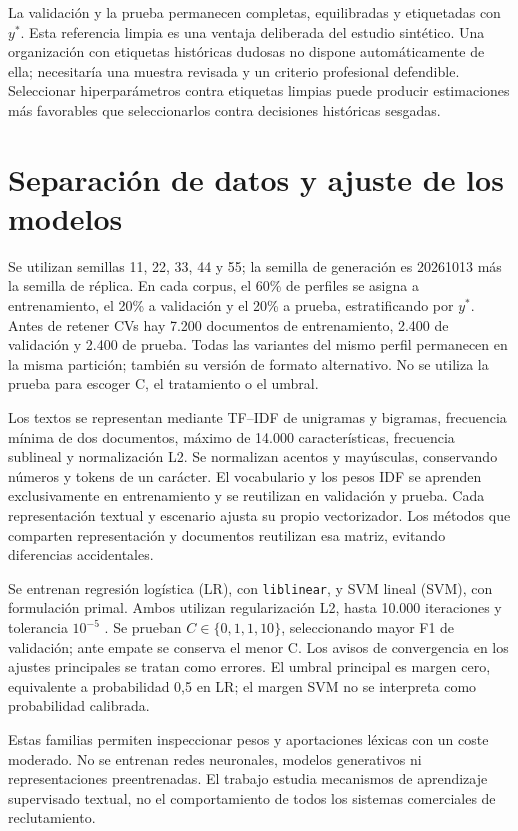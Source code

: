 \documentclass[11pt,a4paper,oneside]{report}
\begin{document}
La validación y la prueba permanecen completas, equilibradas y etiquetadas con $y^*$. Esta referencia limpia es una ventaja deliberada del estudio sintético. Una organización con etiquetas históricas dudosas no dispone automáticamente de ella; necesitaría una muestra revisada y un criterio profesional defendible. Seleccionar hiperparámetros contra etiquetas limpias puede producir estimaciones más favorables que seleccionarlos contra decisiones históricas sesgadas.

\section{Separación de datos y ajuste de los modelos}
Se utilizan semillas 11, 22, 33, 44 y 55; la semilla de generación es 20261013 más la semilla de réplica. En cada corpus, el 60\% de perfiles se asigna a entrenamiento, el 20\% a validación y el 20\% a prueba, estratificando por $y^*$. Antes de retener CVs hay 7.200 documentos de entrenamiento, 2.400 de validación y 2.400 de prueba. Todas las variantes del mismo perfil permanecen en la misma partición; también su versión de formato alternativo. No se utiliza la prueba para escoger C, el tratamiento o el umbral.

Los textos se representan mediante TF--IDF de unigramas y bigramas, frecuencia mínima de dos documentos, máximo de 14.000 características, frecuencia sublineal y normalización L2. Se normalizan acentos y mayúsculas, conservando números y tokens de un carácter. El vocabulario y los pesos IDF se aprenden exclusivamente en entrenamiento y se reutilizan en validación y prueba. Cada representación textual y escenario ajusta su propio vectorizador. Los métodos que comparten representación y documentos reutilizan esa matriz, evitando diferencias accidentales.

Se entrenan regresión logística (LR), con \texttt{liblinear}, y SVM lineal (SVM), con formulación primal. Ambos utilizan regularización L2, hasta 10.000 iteraciones y tolerancia $10^{-5}$ \cite{sklearnapi}. Se prueban $C\in\{0{,}1,1,10\}$, seleccionando mayor F1 de validación; ante empate se conserva el menor C. Los avisos de convergencia en los ajustes principales se tratan como errores. El umbral principal es margen cero, equivalente a probabilidad 0,5 en LR; el margen SVM no se interpreta como probabilidad calibrada.

Estas familias permiten inspeccionar pesos y aportaciones léxicas con un coste moderado. No se entrenan redes neuronales, modelos generativos ni representaciones preentrenadas. El trabajo estudia mecanismos de aprendizaje supervisado textual, no el comportamiento de todos los sistemas comerciales de reclutamiento.
\end{document}
